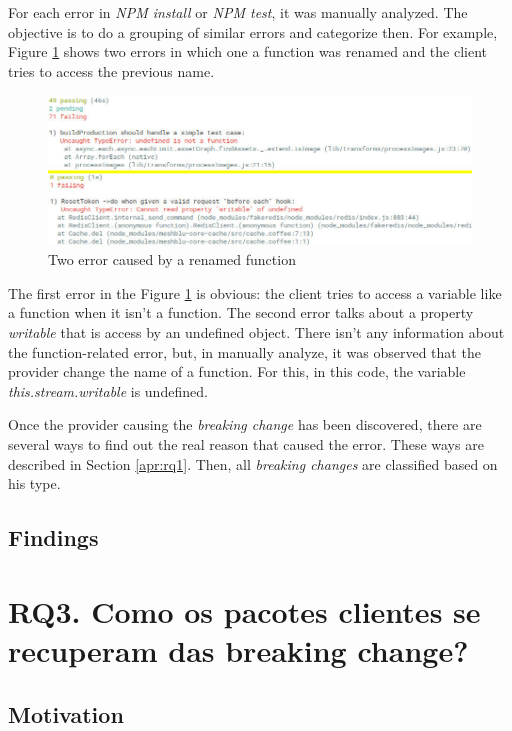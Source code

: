 For each error in \textit{\Gls{NPM} install} or \textit{\Gls{NPM} test}, it was manually analyzed. The objective is to do a grouping of similar errors and categorize then. For example, Figure \ref{fig:error_category} shows two errors in which one a function was renamed and the client tries to access the previous name.

\begin{figure}[!h]
    \centering
    \includegraphics[scale=0.5]{figuras/error_category.jpeg}
    \caption{Two error caused by a renamed function}
    \label{fig:error_category}
\end{figure}

The first error in the Figure \ref{fig:error_category} is obvious: the client tries to access a variable like a function when it isn't a function. The second error talks about a property \textit{writable} that is access by an undefined object. There isn't any information about the function-related error, but, in manually analyze, it was observed that the provider change the name of a function. For this, in this code, the variable \textit{this.stream.writable} is undefined.

Once the provider causing the \textit{breaking change} has been discovered, there are several ways to find out the real reason that caused the error. These ways are described in Section \ref{apr:rq1}. Then, all \textit{breaking changes} are classified based on his type.

\subsection{Findings}
\label{fin:rq2}

\section{RQ3. Como os pacotes clientes se recuperam das breaking change?}
\label{sec:rq3}

\subsection{Motivation}
\label{mot:rq3}

